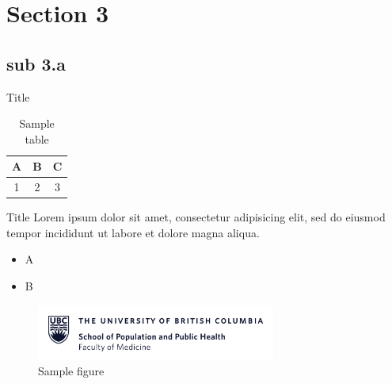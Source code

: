 \documentclass[aspectratio=43]{beamer}
\begin{document}
	
	\section{Section 3}
	\subsection{sub 3.a}
	
	\begin{frame}{Title}
		\begin{table}
			\centering
			\caption{Sample table}
			\begin{tabular}{c|c|c}
				A & B & C\\
				\hline
				1 & 2 & 3
			\end{tabular}
		\end{table}
	\end{frame}
	
	\begin{frame}{Title}
		Lorem ipsum dolor sit amet, consectetur adipisicing elit, sed do eiusmod tempor incididunt ut labore et dolore magna aliqua.
		\begin{itemize}
			\item A
			\item B
		\end{itemize}		
		\begin{figure}
			\centering			
			\includegraphics[width=0.7\textwidth]{logos/spph_logo_full_blue}
			\caption{Sample figure}
		\end{figure}
	\end{frame}
	
	
\end{document}
